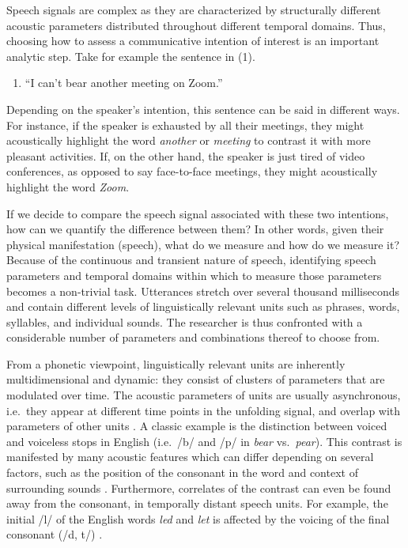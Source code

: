 \documentclass[Review,times,sageh]{sagej}
\providecommand{\tightlist}{\setlength{\itemsep}{0pt}\setlength{\parskip}{0pt}}
\begin{document}
Speech signals are complex as they are characterized by structurally different acoustic parameters distributed throughout different temporal domains.
Thus, choosing how to assess a communicative intention of interest is an important analytic step.
Take for example the sentence in (1).

\vspace{1em}

\begin{enumerate}
\def\labelenumi{(\arabic{enumi})}
\tightlist
\item
  ``I can't bear another meeting on Zoom.''
  \vspace{1em}
\end{enumerate}

\noindent Depending on the speaker's intention, this sentence can be said in different ways.
For instance, if the speaker is exhausted by all their meetings, they might acoustically highlight the word \emph{another} or \emph{meeting} to contrast it with more pleasant activities.
If, on the other hand, the speaker is just tired of video conferences, as opposed to say face-to-face meetings, they might acoustically highlight the word \emph{Zoom}.

If we decide to compare the speech signal associated with these two intentions, how can we quantify the difference between them?
In other words, given their physical manifestation (speech), what do we measure and how do we measure it?
Because of the continuous and transient nature of speech, identifying speech parameters and temporal domains within which to measure those parameters becomes a non-trivial task.
Utterances stretch over several thousand milliseconds and contain different levels of linguistically relevant units such as phrases, words, syllables, and individual sounds.
The researcher is thus confronted with a considerable number of parameters and combinations thereof to choose from.

From a phonetic viewpoint, linguistically relevant units are inherently multidimensional and dynamic: they consist of clusters of parameters that are modulated over time.
The acoustic parameters of units are usually asynchronous, i.e.~they appear at different time points in the unfolding signal, and overlap with parameters of other units \citep[e.g.][]{jongman2000acoustic, lisker1986voicing, summerfield1981articulatory, winter2014spoken}.
A classic example is the distinction between voiced and voiceless stops in English (i.e.~/b/ and /p/ in \emph{bear} vs.~\emph{pear}).
This contrast is manifested by many acoustic features which can differ depending on several factors, such as the position of the consonant in the word and context of surrounding sounds \citep{lisker1977rapid}.
Furthermore, correlates of the contrast can even be found away from the consonant, in temporally distant speech units.
For example, the initial /l/ of the English words \emph{led} and \emph{let} is affected by the voicing of the final consonant (/d, t/) \citep{hawkins2004influence}.
\end{document}
